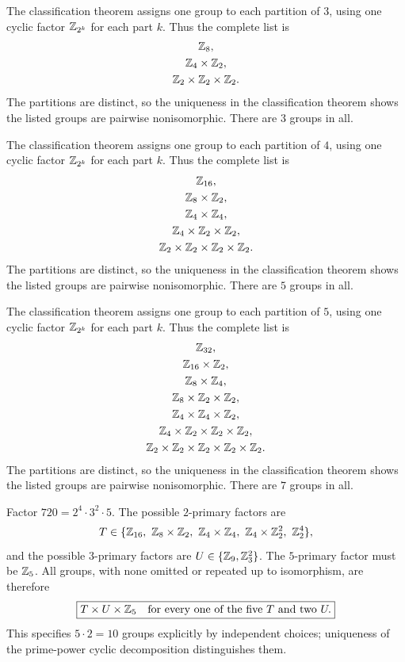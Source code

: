 The classification theorem assigns one group to each partition of $3$, using one cyclic factor $\mathbb{Z}_{2^k}$ for each part $k$. Thus the complete list is\[\begin{gathered}\mathbb{Z}_{8},\\\mathbb{Z}_{4}\times\mathbb{Z}_{2},\\\mathbb{Z}_{2}\times\mathbb{Z}_{2}\times\mathbb{Z}_{2}.\end{gathered}\]The partitions are distinct, so the uniqueness in the classification theorem shows the listed groups are pairwise nonisomorphic. There are $3$ groups in all.

The classification theorem assigns one group to each partition of $4$, using one cyclic factor $\mathbb{Z}_{2^k}$ for each part $k$. Thus the complete list is\[\begin{gathered}\mathbb{Z}_{16},\\\mathbb{Z}_{8}\times\mathbb{Z}_{2},\\\mathbb{Z}_{4}\times\mathbb{Z}_{4},\\\mathbb{Z}_{4}\times\mathbb{Z}_{2}\times\mathbb{Z}_{2},\\\mathbb{Z}_{2}\times\mathbb{Z}_{2}\times\mathbb{Z}_{2}\times\mathbb{Z}_{2}.\end{gathered}\]The partitions are distinct, so the uniqueness in the classification theorem shows the listed groups are pairwise nonisomorphic. There are $5$ groups in all.

The classification theorem assigns one group to each partition of $5$, using one cyclic factor $\mathbb{Z}_{2^k}$ for each part $k$. Thus the complete list is\[\begin{gathered}\mathbb{Z}_{32},\\\mathbb{Z}_{16}\times\mathbb{Z}_{2},\\\mathbb{Z}_{8}\times\mathbb{Z}_{4},\\\mathbb{Z}_{8}\times\mathbb{Z}_{2}\times\mathbb{Z}_{2},\\\mathbb{Z}_{4}\times\mathbb{Z}_{4}\times\mathbb{Z}_{2},\\\mathbb{Z}_{4}\times\mathbb{Z}_{2}\times\mathbb{Z}_{2}\times\mathbb{Z}_{2},\\\mathbb{Z}_{2}\times\mathbb{Z}_{2}\times\mathbb{Z}_{2}\times\mathbb{Z}_{2}\times\mathbb{Z}_{2}.\end{gathered}\]The partitions are distinct, so the uniqueness in the classification theorem shows the listed groups are pairwise nonisomorphic. There are $7$ groups in all.

Factor $720=2^4\cdot3^2\cdot5$. The possible $2$-primary factors are
\[T\in\{\Z_{16},\ \Z_8\times\Z_2,\ \Z_4\times\Z_4,\ \Z_4\times\Z_2^2,\ \Z_2^4\},\]
and the possible $3$-primary factors are $U\in\{\mathbb{Z}_9,\mathbb{Z}_3^2\}$. The $5$-primary factor must be $\mathbb{Z}_5$. All groups, with none omitted or repeated up to isomorphism, are therefore
\[\boxed{T\times U\times\mathbb{Z}_5\quad\text{for every one of the five }T\text{ and two }U.}\]
This specifies $5\cdot2=10$ groups explicitly by independent choices; uniqueness of the prime-power cyclic decomposition distinguishes them.

